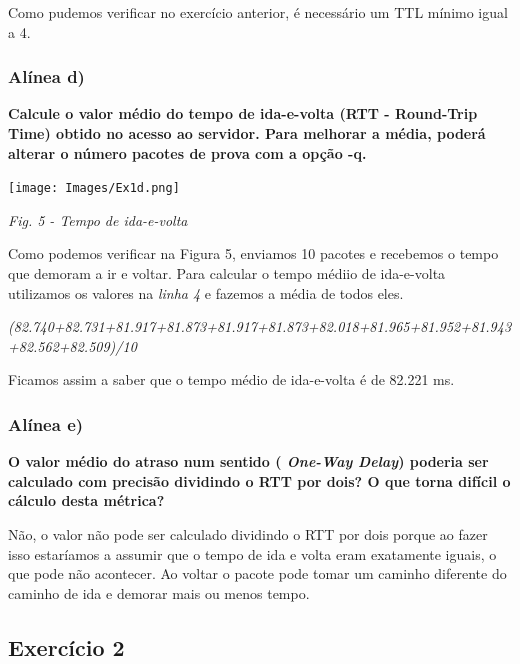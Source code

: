 \documentclass{article}
\begin{document}
\hspace{0.5cm}Como pudemos verificar no exercício anterior, é necessário um TTL mínimo igual a 4.\par\clearpage

\subsubsection{Alínea d)}
\textbf{Calcule o valor médio do tempo de ida-e-volta (RTT - Round-Trip Time) obtido no acesso ao servidor. Para melhorar a média, poderá alterar o número pacotes de prova com a opção -q.}\par
\begin{center}
\texttt{[image: Images/Ex1d.png]}\par
\caption{\textit{Fig. 5 - Tempo de ida-e-volta}}\par\vspace{0.35cm}
\end{center}


\hspace{0.5cm}Como podemos verificar na Figura 5, enviamos 10 pacotes e recebemos o tempo que demoram a ir e voltar. Para calcular o tempo médiio de ida-e-volta utilizamos os valores na \textit{linha 4} e fazemos a média de todos eles.\par
\vspace{0.5}
\textit{\small(82.740+82.731+81.917+81.873+81.917+81.873+82.018+81.965+81.952+81.943+82.562+82.509)/10}\par
Ficamos assim a saber que o tempo médio de ida-e-volta é de 82.221 ms.\vspace{0.35cm}

\subsubsection{Alínea e)}
\textbf{O valor médio do atraso num sentido ( \textit{One-Way Delay}) poderia ser calculado com precisão dividindo o RTT por dois? O que torna difícil o cálculo desta métrica?}\par
\vspace{0.35 cm}
\hspace{0.5cm}Não, o valor não pode ser calculado dividindo o RTT por dois porque ao fazer isso estaríamos a assumir que o tempo de ida e volta eram exatamente iguais, o que pode não acontecer. Ao voltar o pacote pode tomar um caminho diferente do caminho de ida e demorar mais ou menos tempo.
\cleardoublepage
\subsection{Exercício 2}
\end{document}
